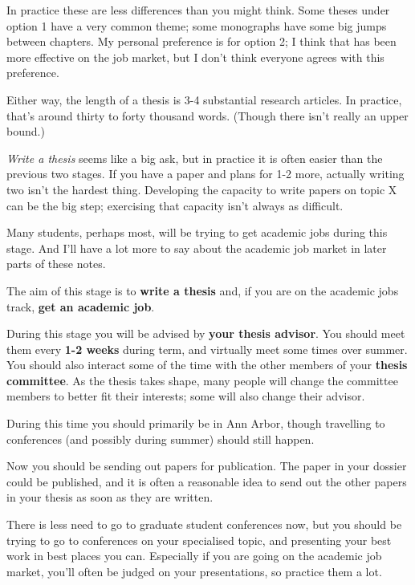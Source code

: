 \documentclass[]{book}
\begin{document}
In practice these are less differences than you might think. Some theses under option 1 have a very common theme; some monographs have some big jumps between chapters. My personal preference is for option 2; I think that has been more effective on the job market, but I don't think everyone agrees with this preference.

Either way, the length of a thesis is 3-4 substantial research articles. In practice, that's around thirty to forty thousand words. (Though there isn't really an upper bound.)

\emph{Write a thesis} seems like a big ask, but in practice it is often easier than the previous two stages. If you have a paper and plans for 1-2 more, actually writing two isn't the hardest thing. Developing the capacity to write papers on topic X can be the big step; exercising that capacity isn't always as difficult.

Many students, perhaps most, will be trying to get academic jobs during this stage. And I'll have a lot more to say about the academic job market in later parts of these notes.

The aim of this stage is to \textbf{write a thesis} and, if you are on the academic jobs track, \textbf{get an academic job}.

During this stage you will be advised by \textbf{your thesis advisor}. You should meet them every \textbf{1-2 weeks} during term, and virtually meet some times over summer. You should also interact some of the time with the other members of your \textbf{thesis committee}. As the thesis takes shape, many people will change the committee members to better fit their interests; some will also change their advisor.

During this time you should primarily be in Ann Arbor, though travelling to conferences (and possibly during summer) should still happen.

Now you should be sending out papers for publication. The paper in your dossier could be published, and it is often a reasonable idea to send out the other papers in your thesis as soon as they are written.

There is less need to go to graduate student conferences now, but you should be trying to go to conferences on your specialised topic, and presenting your best work in best places you can. Especially if you are going on the academic job market, you'll often be judged on your presentations, so practice them a lot.
\end{document}
